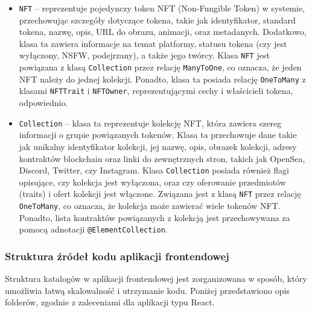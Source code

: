 \begin{itemize}
\item \texttt{NFT} -- reprezentuje pojedynczy token NFT (Non-Fungible Token) w systemie, przechowując szczegóły dotyczące tokena, takie jak identyfikator, standard tokena, nazwę, opis, URL do obrazu, animacji, oraz metadanych. Dodatkowo, klasa ta zawiera informacje na temat platformy, statusu tokena (czy jest wyłączony, NSFW, podejrzany), a także jego twórcy.\newline
Klasa \texttt{NFT} jest powiązana z klasą \texttt{Collection} przez relację \texttt{ManyToOne}, co oznacza, że jeden NFT należy do jednej kolekcji. Ponadto, klasa ta posiada relację \texttt{OneToMany} z klasami \texttt{NFTTrait} i \texttt{NFTOwner}, reprezentującymi cechy i właścicieli tokena, odpowiednio. 

\item \texttt{Collection} -- klasa ta reprezentuje kolekcję NFT, która zawiera szereg informacji o grupie powiązanych tokenów. Klasa ta przechowuje dane takie jak unikalny identyfikator kolekcji, jej nazwę, opis, obrazek kolekcji, adresy kontraktów blockchain oraz linki do zewnętrznych stron, takich jak OpenSea, Discord, Twitter, czy Instagram.
\newline
Klasa \texttt{Collection} posiada również flagi opisujące, czy kolekcja jest wyłączona, oraz czy oferowanie przedmiotów (traits) i ofert kolekcji jest włączone. Związana jest z klasą \texttt{NFT} przez relację \texttt{OneToMany}, co oznacza, że kolekcja może zawierać wiele tokenów NFT. Ponadto, lista kontraktów powiązanych z kolekcją jest przechowywana za pomocą adnotacji \texttt{@ElementCollection}.
\end{itemize}


\subsubsection{Struktura źródeł kodu aplikacji frontendowej}
Struktura katalogów w aplikacji frontendowej jest zorganizowana w sposób, który umożliwia łatwą skalowalność i utrzymanie kodu. Poniżej przedstawiono opis folderów, zgodnie z zaleceniami dla aplikacji typu React.

